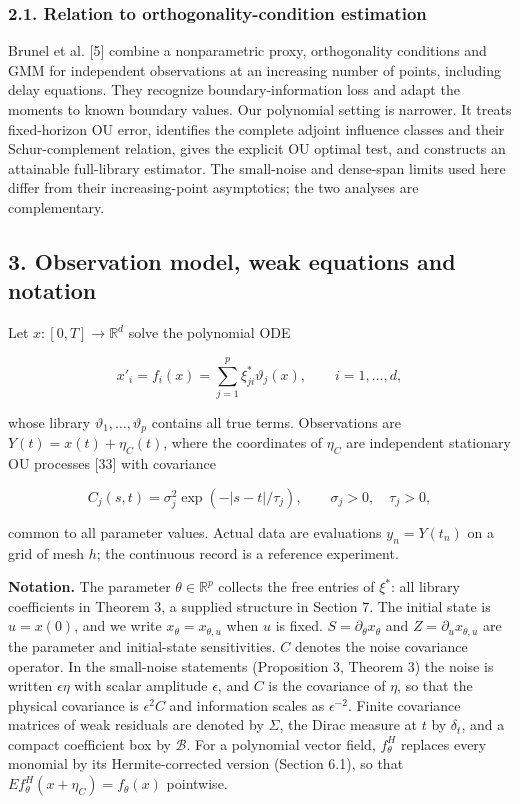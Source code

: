 \documentclass[
  american,
  11pt,
]{article}
\begin{document}
\subsubsection{2.1. Relation to orthogonality-condition
estimation}\label{relation-to-orthogonality-condition-estimation}

Brunel et al. {[}5{]} combine a nonparametric proxy, orthogonality
conditions and GMM for independent observations at an increasing number
of points, including delay equations. They recognize
boundary-information loss and adapt the moments to known boundary
values. Our polynomial setting is narrower. It treats fixed-horizon OU
error, identifies the complete adjoint influence classes and their
Schur-complement relation, gives the explicit OU optimal test, and
constructs an attainable full-library estimator. The small-noise and
dense-span limits used here differ from their increasing-point
asymptotics; the two analyses are complementary.

\subsection{3. Observation model, weak equations and
notation}\label{observation-model-weak-equations-and-notation}

Let \(x:[0,T]\to\mathbb R^d\) solve the polynomial ODE

\[
x'_i=f_i(x)=\sum_{j=1}^{p}\xi^*_{ji}\vartheta_j(x),\qquad i=1,\ldots,d,
\]

whose library \(\vartheta_1,\ldots,\vartheta_p\) contains all true
terms. Observations are \(Y(t)=x(t)+\eta_C(t)\), where the coordinates
of \(\eta_C\) are independent stationary OU processes {[}33{]} with
covariance

\[
C_j(s,t)=\sigma_j^2\exp(-|s-t|/\tau_j),\qquad \sigma_j>0,\quad\tau_j>0,
\]

common to all parameter values. Actual data are evaluations
\(y_n=Y(t_n)\) on a grid of mesh \(h\); the continuous record is a
reference experiment.

\textbf{Notation.} The parameter \(\theta\in\mathbb R^p\) collects the
free entries of \(\xi^*\): all library coefficients in Theorem 3, a
supplied structure in Section 7. The initial state is \(u=x(0)\), and we
write \(x_\theta=x_{\theta,u}\) when \(u\) is fixed.
\(S=\partial_\theta x_\theta\) and \(Z=\partial_u x_{\theta,u}\) are the
parameter and initial-state sensitivities. \(C\) denotes the noise
covariance operator. In the small-noise statements (Proposition 3,
Theorem 3) the noise is written \(\epsilon\eta\) with scalar amplitude
\(\epsilon\), and \(C\) is the covariance of \(\eta\), so that the
physical covariance is \(\epsilon^2C\) and information scales as
\(\epsilon^{-2}\). Finite covariance matrices of weak residuals are
denoted by \(\Sigma\), the Dirac measure at \(t\) by \(\delta_t\), and a
compact coefficient box by \(\mathcal B\). For a polynomial vector
field, \(f_\theta^H\) replaces every monomial by its Hermite-corrected
version (Section 6.1), so that \(E f_\theta^H(x+\eta_C)=f_\theta(x)\)
pointwise.
\end{document}
